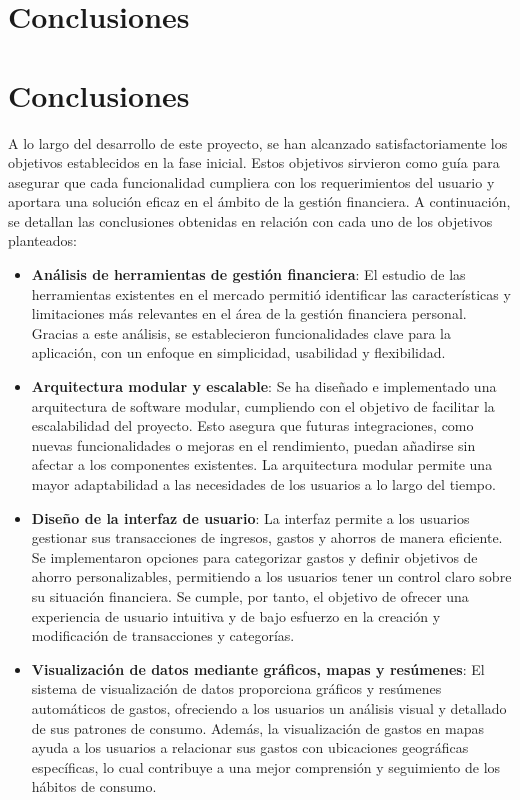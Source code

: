 \section{Conclusiones}
\section{Conclusiones}
A lo largo del desarrollo de este proyecto, se han alcanzado satisfactoriamente los objetivos establecidos en la fase inicial. Estos objetivos sirvieron como guía para asegurar que cada funcionalidad cumpliera con los requerimientos del usuario y aportara una solución eficaz en el ámbito de la gestión financiera. A continuación, se detallan las conclusiones obtenidas en relación con cada uno de los objetivos planteados:

\begin{itemize}
    \item \textbf{Análisis de herramientas de gestión financiera}: El estudio de las herramientas existentes en el mercado permitió identificar las características y limitaciones más relevantes en el área de la gestión financiera personal. Gracias a este análisis, se establecieron funcionalidades clave para la aplicación, con un enfoque en simplicidad, usabilidad y flexibilidad.

    \item \textbf{Arquitectura modular y escalable}: Se ha diseñado e implementado una arquitectura de software modular, cumpliendo con el objetivo de facilitar la escalabilidad del proyecto. Esto asegura que futuras integraciones, como nuevas funcionalidades o mejoras en el rendimiento, puedan añadirse sin afectar a los componentes existentes. La arquitectura modular permite una mayor adaptabilidad a las necesidades de los usuarios a lo largo del tiempo.

    \item \textbf{Diseño de la interfaz de usuario}: La interfaz permite a los usuarios gestionar sus transacciones de ingresos, gastos y ahorros de manera eficiente. Se implementaron opciones para categorizar gastos y definir objetivos de ahorro personalizables, permitiendo a los usuarios tener un control claro sobre su situación financiera. Se cumple, por tanto, el objetivo de ofrecer una experiencia de usuario intuitiva y de bajo esfuerzo en la creación y modificación de transacciones y categorías.

    \item \textbf{Visualización de datos mediante gráficos, mapas y resúmenes}: El sistema de visualización de datos proporciona gráficos y resúmenes automáticos de gastos, ofreciendo a los usuarios un análisis visual y detallado de sus patrones de consumo. Además, la visualización de gastos en mapas ayuda a los usuarios a relacionar sus gastos con ubicaciones geográficas específicas, lo cual contribuye a una mejor comprensión y seguimiento de los hábitos de consumo.


\end{itemize}
